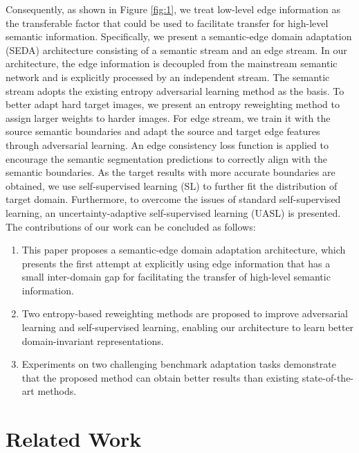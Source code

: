 \documentclass[sigconf]{acmart}
\begin{document}
\par Consequently, as shown in Figure \ref{fig:1}, we treat low-level edge information as the transferable factor that could be used to facilitate transfer for high-level semantic information. Specifically, we present a semantic-edge domain adaptation (SEDA) architecture consisting of a semantic stream and an edge stream. In our architecture, the edge information is decoupled from the mainstream semantic network and is explicitly processed by an independent stream. The semantic stream adopts the existing entropy adversarial learning method as the basis. To better adapt hard target images, we present an entropy reweighting method to assign larger weights to harder images. For edge stream, we train it with the source semantic boundaries and adapt the source and target edge features through adversarial learning. An edge consistency loss function is applied to encourage the semantic segmentation predictions to correctly align with the semantic boundaries. As the target results with more accurate boundaries are obtained, we use self-supervised learning (SL) to further fit the distribution of target domain. Furthermore, to overcome the issues of standard self-supervised learning, an uncertainty-adaptive self-supervised learning (UASL) is presented. The contributions of our work can be concluded as follows:
\begin{enumerate}
\item This paper proposes a semantic-edge domain adaptation architecture, which presents the first attempt at explicitly using edge information that has a small inter-domain gap for facilitating the transfer of high-level semantic information.
\item Two entropy-based reweighting methods are proposed to improve adversarial learning and self-supervised learning, enabling our architecture to learn better domain-invariant representations.
\item Experiments on two challenging benchmark adaptation tasks demonstrate that the proposed method can obtain better results than existing state-of-the-art methods.
\end{enumerate}
\section{Related Work}
\end{document}
